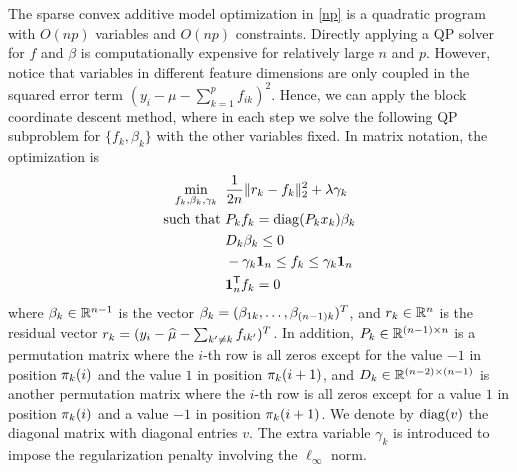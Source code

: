 The sparse convex additive model optimization in \eqref{np} is a quadratic program with
$O(np)$ variables and $O(np)$ constraints. 
Directly applying a QP solver for $f$ and $\beta$
is computationally expensive for relatively large
$n$ and $p$. However, notice that variables in different feature
dimensions are only coupled in the squared error term
$(y_{i}-\mu - \sum_{k=1}^{p}f_{ik})^{2}$. Hence, we can apply the block
coordinate descent method, where in each step we solve the following
QP subproblem for $\{f_k, \beta_k\}$ with the
other variables fixed. In matrix notation, the optimization is
\begin{align}
\begin{split}
\min_{ f_k, \beta_k, \gamma_k} \;\;& \frac{1}{2n} \| r_k - f_k \|_2^2 
     + \lambda \gamma_k \label{opt:1d_compact} \\
 \textrm{such that } & P_k f_k = \mathop{\rm diag}(P_k x_k)  \beta_k \\
   & D_k \beta_k \leq 0 \\
   & -\gamma_k \mbox{\boldmath $1$}_n \leq f_k \leq \gamma_k \mbox{\boldmath $1$}_n   \\
   & \mbox{\boldmath $1$}_n^{\mathsf{T}} f_k = 0 
\end{split}
\end{align}
where $\beta_k \in {\mathbb R}^{n-1}$ is the vector $\beta_k =
(\beta_{1k}, \ldots, \beta_{(n-1)k})^T$, and
$r_{k} \in {\mathbb R}^n$ is the residual vector $r_{k} = (y_i -
\widehat\mu - \sum_{k' \neq k} f_{ik'})^T$.
In addition, 
$P_k \in {\mathbb R}^{(n-1) \times n}$ is a permutation matrix where the $i$-th
row  is all zeros except for the value $-1$ in position $\pi_k(i)$ and
the value $1$ in
position $\pi_k(i+1)$, and $D_k \in {\mathbb R}^{(n-2) \times (n-1)}$ is another
permutation matrix  where the $i$-th row is all zeros except for a
value $1$  in position $\pi_k(i)$ and a value $-1$ in position $\pi_k(i+1)$.  We denote by
$\mathop{\rm diag}( v )$ the diagonal matrix with diagonal entries $v$.
The extra variable $\gamma_{k}$ is introduced to impose the
regularization penalty involving the $\ell_{\infty}$ norm.  


